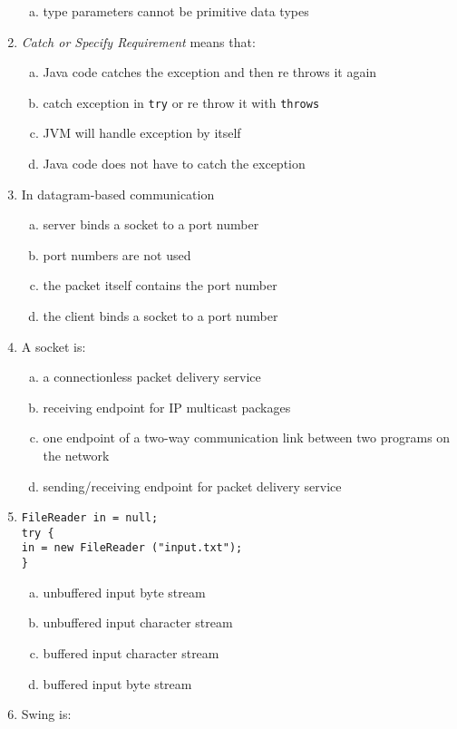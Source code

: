 \documentclass[10pt,a4paper,twocolumn]{article}
\begin{document}
\begin{enumerate}
\begin{enumerate}[(a)]
	\item type parameters cannot be primitive data types
\end{enumerate}
\item \textit{Catch or Specify Requirement} means that:
\begin{enumerate}[(a)]
	\item Java code catches the exception and then re throws it again
	\item catch exception in \texttt{try} or re throw it with \texttt{throws}
	\item JVM will handle exception by itself
	\item Java code does not have to catch the exception
\end{enumerate}
\item In datagram-based communication
\begin{enumerate}[(a)]
	\item server binds a socket to a port number
	\item port numbers are not used
	\item the packet itself contains the port number
	\item the client binds a socket to a port number
\end{enumerate}
\item A socket is:
\begin{enumerate}[(a)]
	\item a connectionless packet delivery service
	\item receiving endpoint for IP multicast packages
	\item one endpoint of a two-way communication link between two programs on the network
	\item sending/receiving endpoint for packet delivery service
\end{enumerate}
\item \begin{verbatim}
FileReader in = null;
try {
in = new FileReader ("input.txt");
}
\end{verbatim}
\begin{enumerate}[(a)]
	\item unbuffered input byte stream
	\item unbuffered input character stream
	\item buffered input character stream
	\item buffered input byte stream
\end{enumerate}
\item Swing is:
\begin{enumerate}[(a)]

\end{enumerate}
\end{enumerate}
\end{document}

